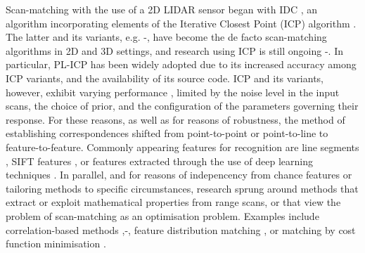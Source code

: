Scan-matching with the use of a 2D LIDAR sensor began with IDC \cite{LuMilios},
an algorithm incorporating elements of the Iterative Closest Point (ICP)
algorithm \cite{ICP}. The latter and its variants, e.g.
\cite{weighted}-\cite{plicp}, have become the de facto scan-matching algorithms
in 2D and 3D settings, and research using ICP is still ongoing
\cite{ICP_var_1}-\cite{Marchel}. In particular, PL-ICP \cite{plicp} has been
widely adopted due to its increased accuracy among ICP variants, and the
availability of its source code. ICP and its variants, however, exhibit varying
performance \cite{icp_comp_trade}, limited by the noise level in the input
scans, the choice of prior, and the configuration of the parameters
governing their response. For these reasons, as well as for reasons of
robustness, the method of establishing correspondences shifted from
point-to-point or point-to-line to feature-to-feature. Commonly appearing
features for recognition are line segments \cite{CLS}\cite{Haytham}\cite{Wen},
SIFT features \cite{Jiayuan}, or features extracted through the use of deep
learning techniques \cite{Jiaxin}. In parallel, and for reasons of
indepencency from chance features or tailoring methods to specific
circumstances, research sprung around methods that extract or exploit
mathematical properties from range scans, or that view the problem of
scan-matching as an optimisation problem. Examples include correlation-based
methods \cite{olson},\cite{olson_2015}-\cite{Konecny}, feature distribution
matching \cite{HSM}, or matching by cost function minimisation \cite{PB_PSM}.

